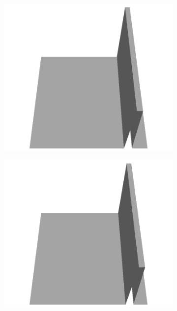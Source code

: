 \documentclass[../document.tex]{subfiles}
\begin{document}
\begin{figure}[H]
\begin{subfigure}[b]{0.065\textwidth}
    \includegraphics[width=\linewidth]{../img/5/custom_patches/walls_front/all/21-3d.png}
    \end{subfigure}
    \begin{subfigure}[b]{0.065\textwidth}
    \includegraphics[width=\linewidth]{../img/5/custom_patches/walls_front/all/20-3d.png}
    \end{subfigure}
    \begin{subfigure}[b]{0.065\textwidth}

\end{subfigure}
\end{figure}
\end{document}
